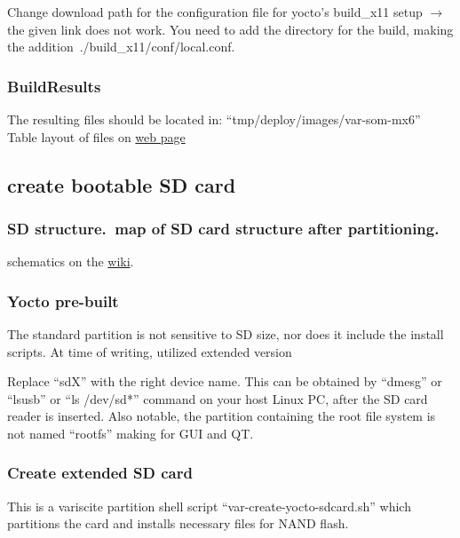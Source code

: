\documentclass[10pt]{article}
\begin{document}
Change download path for the configuration file for yocto's build\_x11 setup $\rightarrow$ the given link does not work. You need to add the directory for the
build, making the addition~./build\_x11/conf/local.conf.


\subsubsection{BuildResults}
The resulting files should be located in:  ``tmp/deploy/images/var-som-mx6'' Table layout of files on
\href{http://variwiki.com/index.php?title=Yocto_Build_Release&release=RELEASE_SUMO_V1.1_VAR-SOM-MX6#Build_Results}{web page}

\subsection{create bootable SD card}

\subsubsection{SD structure.\ map of SD card structure after partitioning.}
schematics on the \href{http://variwiki.com/index.php?title=Yocto_Build_Release&release=RELEASE_SUMO_V1.1_VAR-SOM-MX6#SD_card_structure}{wiki}.

\subsubsection{Yocto pre-built}
The standard partition is not sensitive to SD size, nor does it include the install scripts. At time of writing, utilized extended version

Replace ``sdX'' with the right device name. This can be obtained by ``dmesg'' or ``lsusb'' or ``ls /dev/sd*'' command on your host Linux PC,
after the SD card reader is inserted.
Also notable, the partition containing the root file system is not named ``rootfs'' making for GUI and QT.\


\subsubsection{Create extended SD card}
This is a variscite partition shell script ``var-create-yocto-sdcard.sh'' which partitions the card and installs necessary files for NAND flash.
\end{document}
